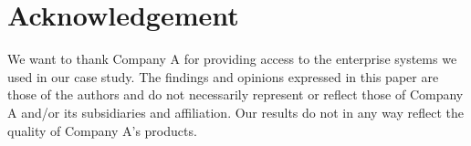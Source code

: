 \section{Acknowledgement}
\label{sec:ack}
We want to thank Company A for providing access to the enterprise systems we used in our case study. The findings and opinions expressed in this paper are those of the authors and do not necessarily represent or reflect those of Company A and/or its subsidiaries and affiliation. Our results do not in any way reflect the quality of Company A's products.


